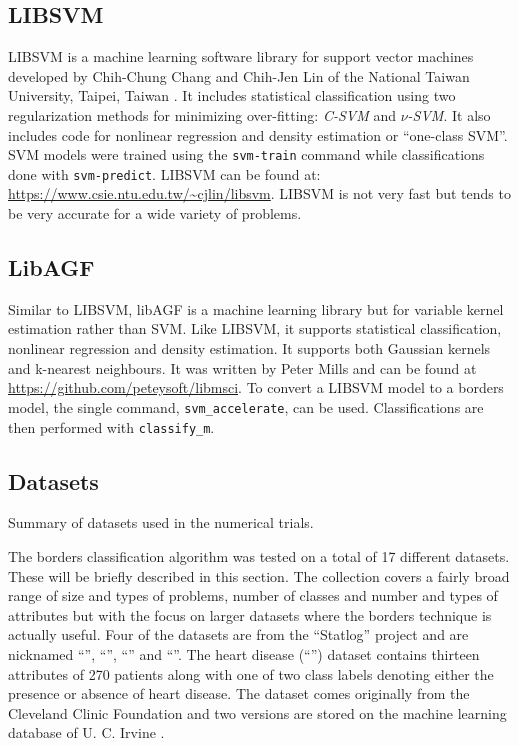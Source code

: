 \subsection{LIBSVM}

LIBSVM is a machine learning software library for support vector machines 
developed by Chih-Chung Chang and Chih-Jen Lin of 
the National Taiwan University, Taipei, Taiwan \citep{Chang_Lin2011}.
It includes statistical classification using two regularization methods 
for minimizing over-fitting: 
{\it C-SVM} and {\it $\nu$-SVM}.
It also includes code for nonlinear regression and density estimation or
``one-class SVM''.
SVM models were trained using the \verb/svm-train/ command while
classifications done with \verb/svm-predict/.
LIBSVM can be found at: \url{https://www.csie.ntu.edu.tw/~cjlin/libsvm}.
LIBSVM is not very fast but tends to be very accurate for a wide variety
of problems.

\subsection{LibAGF}

Similar to LIBSVM, libAGF is a machine learning library but for variable kernel 
estimation \citep{Mills2011,Terrell_Scott1992} rather than SVM.
Like LIBSVM, it supports statistical classification, nonlinear regression
and density estimation.
It supports both Gaussian kernels and k-nearest neighbours.
It was written by Peter Mills and can be found at
\url{https://github.com/peteysoft/libmsci}.
To convert a LIBSVM model to a borders model,
the single command, \verb/svm_accelerate/, can be used.
Classifications are then performed with \verb/classify_m/.

\subsection{Datasets}

\label{datasets}

\begin{table}
  \caption{Summary of datasets used in the numerical trials.}
  \label{summary}
  \ifsubmit
    
  \else
    
  \fi
\end{table}

The borders classification algorithm was tested on a total of 
17 different datasets.
These will be briefly described in this section.
The collection covers a fairly broad range of size and types of problems, 
number of classes and number and types of attributes but with
the focus on larger datasets where the borders technique is actually useful.
Four of the datasets are from
the ``Statlog'' project \citep{Michie_etal1994,King_etal1995} 
and are nicknamed ``'', ``'', ``'' and ``''.
The heart disease (``'') dataset 
contains thirteen attributes of 270 patients along with one of two class labels denoting either the presence or absence of heart disease.
The dataset comes originally from the Cleveland Clinic Foundation and two versions are stored on the machine learning database of U. C. Irvine \citep{Lichman2013}.

